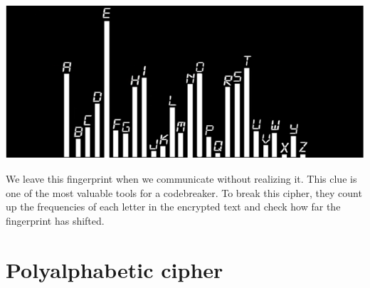 \documentclass{report}
\begin{document}
\begin{center}
	\includegraphics[scale=1]{2.png}
\end{center}
We leave this fingerprint when we communicate without realizing it. This clue is one of the most valuable tools for a codebreaker. To break this cipher, they count up the frequencies of each letter in the encrypted text and check how far the fingerprint has shifted.

\section{Polyalphabetic cipher}
\end{document}
